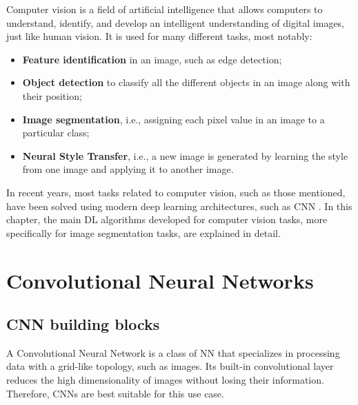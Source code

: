 \label{chapter:background}
Computer vision is a field of artificial intelligence that allows computers to understand, identify, and develop an intelligent understanding of digital images, just like human vision. It is used for many different tasks, most notably:

\begin{itemize}
    \item \textbf{Feature identification} in an image, such as edge detection;
    \item \textbf{Object detection} to classify all the different objects in an image along with their position;
    \item \textbf{Image segmentation}, i.e., assigning each pixel value in an image to a particular class;
    \item \textbf{Neural Style Transfer}, i.e., a new image is generated by learning the style from one image and applying it to another image.
\end{itemize}

In recent years, most tasks related to computer vision, such as those mentioned, have been solved using modern deep learning architectures, such as \ac{CNN} \cite{review:CV}. In this chapter, the main \ac{DL} algorithms developed for computer vision tasks, more specifically for image segmentation tasks, are explained in detail. 

\section{Convolutional Neural Networks}
\label{section:CNN&UNET}


\subsection{CNN building blocks}

A Convolutional Neural Network is a class of \ac{NN} that specializes in processing data with a grid-like topology, such as images. Its built-in convolutional layer reduces the high dimensionality of images without losing their information. Therefore, \ac{CNNs} are best suitable for this use case.

